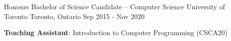 
\begin{cventries}
  \cventry
    {Honours Bachelor of Science Candidate -- Computer Science}
    {University of Toronto}
    {Toronto, Ontario}
    {Sep 2015 - Nov 2020}
    {
      \begin{cvitems}
        \item {\textbf{Teaching Assistant}: Introduction to Computer Programming (CSCA20)}
      \end{cvitems}
    }
\end{cventries}
